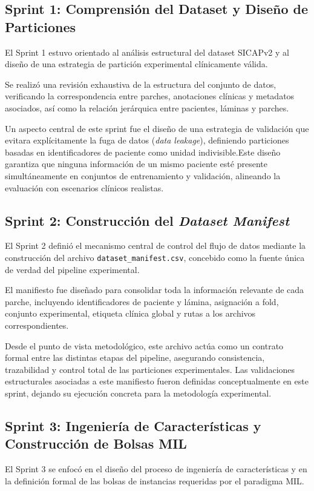 \subsection{Sprint 1: Comprensión del Dataset y Diseño de Particiones}
El Sprint 1 estuvo orientado al análisis estructural del dataset SICAPv2 y al diseño de una estrategia de partición experimental clínicamente válida.\newline

Se realizó una revisión exhaustiva de la estructura del conjunto de datos, verificando la correspondencia entre parches, anotaciones clínicas y metadatos asociados, así como la relación jerárquica entre pacientes, láminas y parches.\newline

Un aspecto central de este sprint fue el diseño de una estrategia de validación que evitara explícitamente la fuga de datos (\textit{data leakage}), definiendo particiones basadas en identificadores de paciente como unidad indivisible.Este diseño garantiza que ninguna información de un mismo paciente esté presente simultáneamente en conjuntos de entrenamiento y validación, alineando la evaluación con escenarios clínicos realistas.

\subsection{Sprint 2: Construcción del \textit{Dataset Manifest}}
El Sprint 2 definió el mecanismo central de control del flujo de datos mediante la construcción del archivo \texttt{dataset\_manifest.csv}, concebido como la fuente única de verdad del pipeline experimental.\newline

El manifiesto fue diseñado para consolidar toda la información relevante de cada parche, incluyendo identificadores de paciente y lámina, asignación a fold, conjunto experimental, etiqueta clínica global y rutas a los archivos correspondientes.\newline

Desde el punto de vista metodológico, este archivo actúa como un contrato formal entre las distintas etapas del pipeline, asegurando consistencia, trazabilidad y control total de las particiones experimentales. Las validaciones estructurales asociadas a este manifiesto fueron definidas conceptualmente en este sprint, dejando su ejecución concreta para la metodología experimental.

\subsection{Sprint 3: Ingeniería de Características y Construcción de Bolsas MIL}
El Sprint 3 se enfocó en el diseño del proceso de ingeniería de características y en la definición formal de las bolsas de instancias requeridas por el paradigma MIL.\newline

